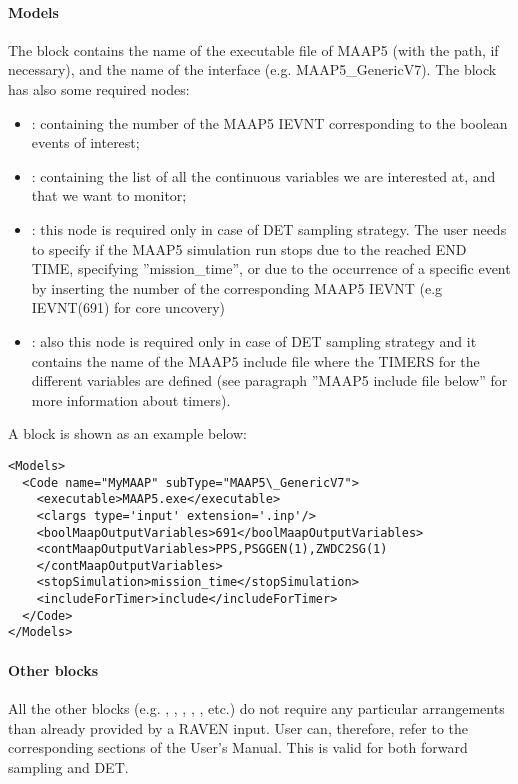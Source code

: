 \paragraph{Models}
The  block contains the name of the executable file of MAAP5
(with the path, if necessary),
and the name of the interface (e.g. MAAP5\_GenericV7).
The block has also some required nodes:
\begin{itemize}
  \item {}: containing the number of the MAAP5 IEVNT corresponding to the boolean events of interest;
  \item {}: containing the list of all the continuous variables we are interested at,
  and that we want to monitor;
  \item {}: this node is required only in case of DET sampling strategy.
The user needs to specify
  if the MAAP5 simulation run stops due to the reached END TIME, specifying ''mission\_time'',
or due to the occurrence of a specific event by
  inserting the number of the corresponding MAAP5 IEVNT (e.g IEVNT(691) for core uncovery)
 \item {}: also this node is required only in case of DET sampling
 strategy and it contains the name of the
 MAAP5 include file where the TIMERS for the different variables are defined
(see paragraph ''MAAP5 include file below'' for more information about timers).
\end{itemize}

A  block is shown as an example below:
\begin{lstlisting}[style=XML]
<Models>
  <Code name="MyMAAP" subType="MAAP5\_GenericV7">
    <executable>MAAP5.exe</executable>
    <clargs type='input' extension='.inp'/>
    <boolMaapOutputVariables>691</boolMaapOutputVariables>
    <contMaapOutputVariables>PPS,PSGGEN(1),ZWDC2SG(1)
    </contMaapOutputVariables>
    <stopSimulation>mission_time</stopSimulation>
    <includeForTimer>include</includeForTimer>
  </Code>
</Models>
\end{lstlisting}
\paragraph{Other blocks}
All the other blocks (e.g. , , ,
 , , etc.)
do not require any particular arrangements than already provided by a RAVEN input.
User can, therefore, refer to the corresponding sections of the User's Manual.
This is valid for both forward sampling and DET.
